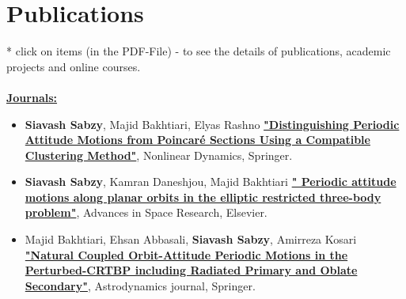 \documentclass[11pt,a4paper, sans]{moderncv}
\begin{document}
\section{Publications}
* \footnotesize click on items (in the PDF-File) - to see the details of publications, academic projects and online courses. \\
\normalsize \\
\textbf{\underline{\href{https://scholar.google.com/citations?user=pz4gpScAAAAJ&hl=en}{Journals:}}}
\begin{itemize}
\item \textbf{Siavash Sabzy}, Majid Bakhtiari, Elyas Rashno 
\textbf{\href{https://link.springer.com/article/10.1007/s11071-024-09288-2}{"Distinguishing Periodic Attitude Motions from Poincaré Sections Using a Compatible Clustering Method"}}, Nonlinear Dynamics, Springer.
\vspace{5pt}
\item \textbf{Siavash Sabzy}, Kamran Daneshjou, Majid Bakhtiari 
 \textbf{\href{https://doi.org/10.1016/j.asr.2021.01.019}{" Periodic attitude motions along planar orbits in the elliptic restricted three-body problem"}}, Advances in Space Research, Elsevier.
 \vspace{5pt}
 \item  Majid Bakhtiari, Ehsan Abbasali, \textbf{Siavash Sabzy}, Amirreza Kosari 
 \textbf{\href{https://link.springer.com/article/10.1007/s42064-022-0154-0}{"Natural Coupled Orbit-Attitude Periodic Motions in the Perturbed-CRTBP including Radiated Primary and Oblate Secondary"}}, Astrodynamics journal, Springer. \\


\end{itemize}
\end{document}
